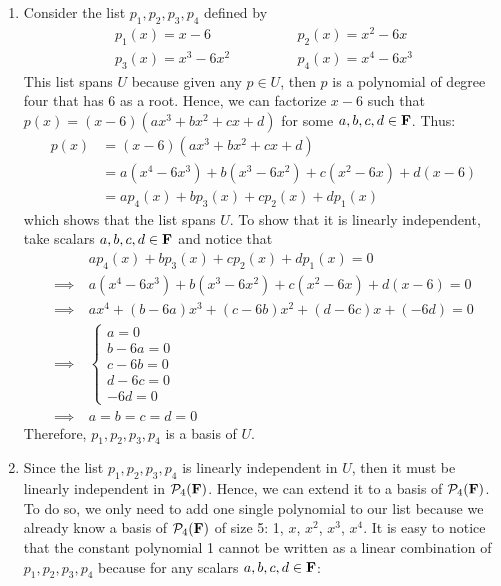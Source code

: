 \begin{solution}
    \begin{enumerate}[label=(\alph*)]
        \item Consider the list $p_1, p_2, p_3, p_4$ defined by
        \begin{align*}
            p_1(x) = x-6 \qquad &\qquad p_2(x) = x^2-6x \\
            p_3(x) = x^3-6x^2 \qquad &\qquad p_4(x) = x^4-6x^3 
        \end{align*}
        This list spans $U$ because given any $p\in U$, then $p$ is a polynomial of degree four that has 6 as a root. Hence, we can factorize $x-6$ such that $p(x) = (x-6)(ax^3 + bx^2 + cx+d)$ for some $a,b,c,d \in \mathbf{F}$. Thus:
        \begin{align*}
            p(x) &= (x-6)(ax^3 + bx^2 + cx+d) \\
            &= a(x^4 - 6x^3) + b(x^3 - 6x^2) + c(x^2 - 6x) + d(x-6) \\
            &= ap_4(x) + bp_3(x) + cp_2(x) + dp_1(x)
        \end{align*}
        which shows that the list spans $U$. To show that it is linearly independent, take scalars $a,b,c,d \in \mathbf{F}$ and notice that
        \begin{align*}
            &ap_4(x) + bp_3(x) + cp_2(x) + dp_1(x) = 0 \\
            \implies \ & a(x^4 - 6x^3) + b(x^3 - 6x^2) + c(x^2 - 6x) + d(x-6) = 0\\
            \implies \ & ax^4 + (b - 6a)x^3 + (c - 6b)x^2 + (d - 6c)x + (-6d) = 0 \\
            \implies \ & \begin{cases}
                a=0 \\ b-6a = 0 \\ c - 6b = 0 \\ d - 6c = 0 \\ -6d = 0
            \end{cases} \\
            \implies \ & a=b=c=d=0
        \end{align*}
        Therefore, $p_1, p_2, p_3, p_4$ is a basis of $U$.
        \item Since the list $p_1, p_2, p_3, p_4$ is linearly independent in $U$, then it must be linearly independent in $\mathcal{P}_4(\mathbf{F})$. Hence, we can extend it to a basis of $\mathcal{P}_4(\mathbf{F})$. To do so, we only need to add one single polynomial to our list because we already know a basis of $\mathcal{P}_4(\mathbf{F})$ of size 5: 1, $x$, $x^2$, $x^3$, $x^4$. It is easy to notice that the constant polynomial 1 cannot be written as a linear combination of $p_1, p_2, p_3, p_4$ because for any scalars $a,b,c,d \in \mathbf{F}$:

\end{enumerate}
\end{solution}
